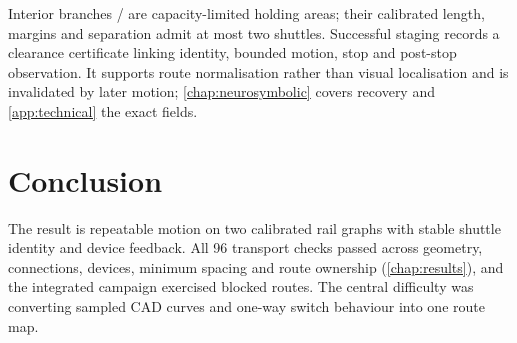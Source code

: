 Interior branches / are capacity-limited holding areas;
their calibrated length, margins and separation admit at most two shuttles.
Successful staging records a clearance certificate linking identity, bounded
motion, stop and post-stop observation. It supports route normalisation rather
than visual localisation and is invalidated by later motion;
\cref{chap:neurosymbolic} covers recovery and \cref{app:technical} the exact
fields.

\section{Conclusion}

The result is repeatable motion on two calibrated rail graphs with stable
shuttle identity and device feedback. All 96 transport checks passed across
geometry, connections, devices, minimum spacing and route ownership
(\cref{chap:results}), and the integrated campaign exercised blocked routes.
The central difficulty was converting sampled CAD curves and one-way switch
behaviour into one route map.
